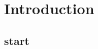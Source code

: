 \documentclass[../Thesis]{subfiles}
\begin{document}
\chapter{Introduction}

\section{start}
\end{document}
